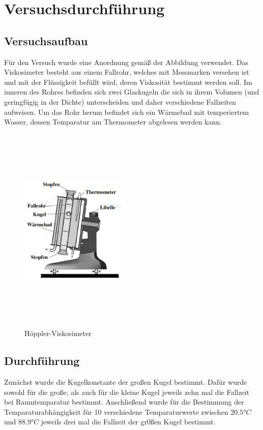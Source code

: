 \section{Versuchsdurchführung}
\label{sec:durchfuehrung}
\subsection{Versuchsaufbau}
\label{sec:aufbau}
Für den Versuch wurde eine Anordnung gemäß der Abbildung verwendet. Das Viskosimeter besteht aus einem Fallrohr, welches mit Messmarken versehen ist und mit der Flüssigkeit befüllt wird, deren Viskosität bestimmt werden soll. Im inneren des Rohres befinden sich zwei Glaskugeln die sich in ihrem Volumen (und geringfügig in der Dichte) unterscheiden und daher verschiedene Fallzeiten aufweisen. Um das Rohr herum befindet sich ein Wärmebad mit temperiertem Wasser, dessen Temparatur am Thermometer abgelesen werden kann. 

\begin{figure}[h]
  \centering
  \includegraphics[width=5cm,height=10cm,keepaspectratio]{Viskosimeter.pdf} %
  \caption{Höppler-Viskosimeter} %
  \label{fig:vanadium}
\end{figure}
\subsection{Durchführung}
Zunächst wurde die Kugelkonstante der großen Kugel bestimmt. Dafür wurde sowohl für die große, als auch für die kleine Kugel jeweils zehn mal die Fallzeit bei Raumtemparatur bestimmt. Anschließend wurde für die Bestimmung der Temparaturabhängigkeit für 10 verschiedene Temparaturwerte zwischen $20.5°C$ und $88.9°C$ jeweils drei mal die Fallzeit der gr0ßen Kugel bestimmt.
